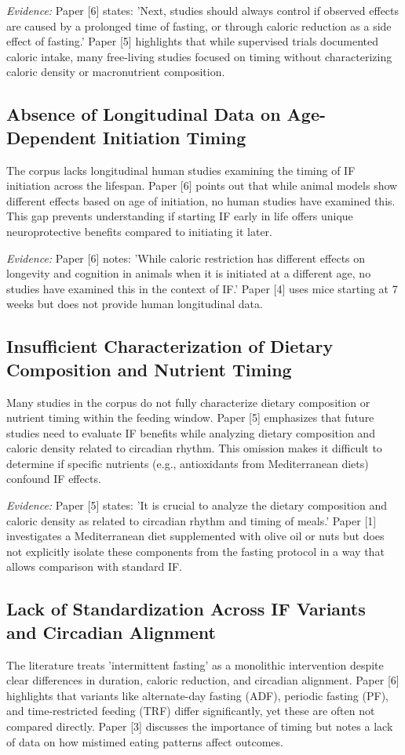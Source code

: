 \documentclass[11pt]{article}
\begin{document}
\textit{Evidence:} Paper [6] states: 'Next, studies should always control if observed effects are caused by a prolonged time of fasting, or through caloric reduction as a side effect of fasting.' Paper [5] highlights that while supervised trials documented caloric intake, many free-living studies focused on timing without characterizing caloric density or macronutrient composition.

\subsection{Absence of Longitudinal Data on Age-Dependent Initiation Timing}
The corpus lacks longitudinal human studies examining the timing of IF initiation across the lifespan. Paper [6] points out that while animal models show different effects based on age of initiation, no human studies have examined this. This gap prevents understanding if starting IF early in life offers unique neuroprotective benefits compared to initiating it later.

\textit{Evidence:} Paper [6] notes: 'While caloric restriction has different effects on longevity and cognition in animals when it is initiated at a different age, no studies have examined this in the context of IF.' Paper [4] uses mice starting at 7 weeks but does not provide human longitudinal data.

\subsection{Insufficient Characterization of Dietary Composition and Nutrient Timing}
Many studies in the corpus do not fully characterize dietary composition or nutrient timing within the feeding window. Paper [5] emphasizes that future studies need to evaluate IF benefits while analyzing dietary composition and caloric density related to circadian rhythm. This omission makes it difficult to determine if specific nutrients (e.g., antioxidants from Mediterranean diets) confound IF effects.

\textit{Evidence:} Paper [5] states: 'It is crucial to analyze the dietary composition and caloric density as related to circadian rhythm and timing of meals.' Paper [1] investigates a Mediterranean diet supplemented with olive oil or nuts but does not explicitly isolate these components from the fasting protocol in a way that allows comparison with standard IF.

\subsection{Lack of Standardization Across IF Variants and Circadian Alignment}
The literature treats 'intermittent fasting' as a monolithic intervention despite clear differences in duration, caloric reduction, and circadian alignment. Paper [6] highlights that variants like alternate-day fasting (ADF), periodic fasting (PF), and time-restricted feeding (TRF) differ significantly, yet these are often not compared directly. Paper [3] discusses the importance of timing but notes a lack of data on how mistimed eating patterns affect outcomes.
\end{document}
